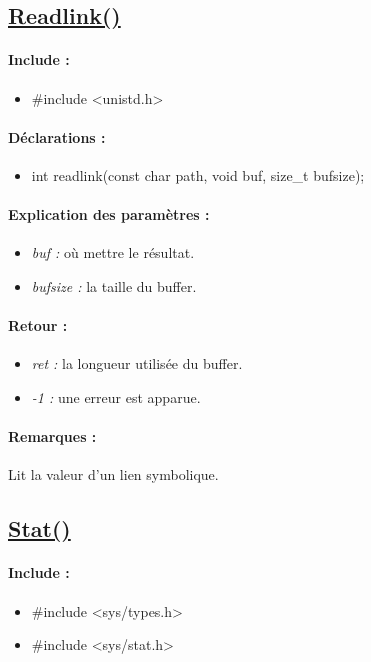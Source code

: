 \documentclass{article}[12pt]
\begin{document}
\subsection{\href{http://jp.barralis.com/linux-man/man2/readlink.2.php}{Readlink()}}
\paragraph{Include : }
\begin{itemize}
	\item \#include <unistd.h>
\end{itemize}
\paragraph{Déclarations : }
\begin{itemize}
	\item int readlink(const char \* path, void \* buf, size\_t bufsize);
\end{itemize}
\paragraph{Explication des paramètres : }
\begin{itemize}
	\item \emph{buf : } où mettre le résultat.
	\item \emph{bufsize : } la taille du buffer.
\end{itemize}
\paragraph{Retour : }
\begin{itemize}
	\item \emph{ret : } la longueur utilisée du buffer. 
	\item \emph{-1 : } une erreur est apparue.
\end{itemize}
\paragraph{Remarques : }
Lit la valeur d'un lien symbolique.
\subsection{\href{http://jp.barralis.com/linux-man/man2/stat.2.php}{Stat()}}
\paragraph{Include : }
\begin{itemize}
	\item \#include <sys/types.h>
	\item \#include <sys/stat.h>
\end{itemize}
\end{document}

